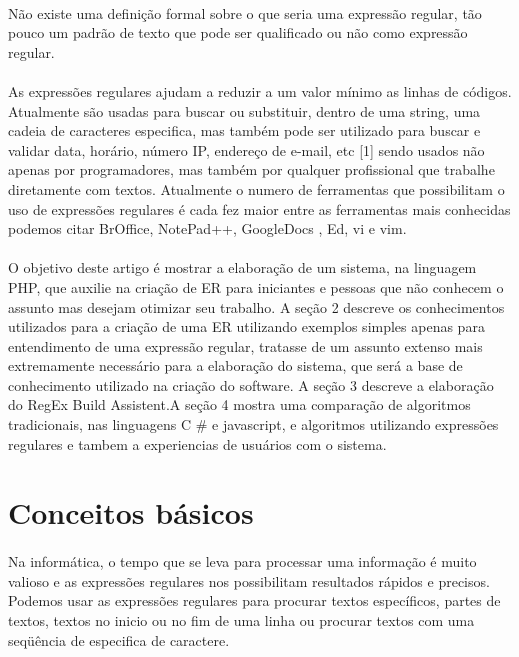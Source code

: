 \documentclass[10pt,a4paper]{article}
\begin{document}
\paragraph*{} Não existe uma definição formal sobre o que seria uma expressão regular, tão pouco um padrão de texto que pode ser qualificado ou não como expressão regular.
\paragraph*{}
 As expressões regulares ajudam a reduzir a um valor mínimo as linhas de códigos. Atualmente são usadas para buscar ou substituir, dentro de uma string, uma cadeia de caracteres especifica, mas também pode ser utilizado para buscar e validar data, horário, número IP, endereço de e-mail, etc [1] sendo usados não apenas por programadores, mas também por qualquer profissional que trabalhe diretamente com textos. Atualmente o numero de ferramentas que possibilitam o uso de expressões regulares é cada fez maior entre as ferramentas mais conhecidas podemos citar BrOffice, NotePad++, GoogleDocs , Ed, vi e vim.
\paragraph*{}
O objetivo deste artigo é mostrar a elaboração de um sistema, na linguagem PHP, que auxilie na criação de ER para iniciantes e pessoas que não conhecem o assunto mas desejam otimizar seu trabalho. A seção 2 descreve os conhecimentos utilizados para a criação de uma ER utilizando exemplos simples apenas para entendimento de uma expressão regular, tratasse de um assunto extenso mais extremamente necessário para a elaboração do sistema, que será a base de conhecimento utilizado na criação do software. A seção 3 descreve a elaboração do RegEx Build Assistent.A seção 4 mostra uma comparação de algoritmos tradicionais, nas linguagens C \# e javascript, e algoritmos utilizando expressões regulares e tambem a experiencias de usuários com o sistema.
\section{Conceitos básicos}
\paragraph*{}
Na informática, o tempo que se leva para processar uma informação é muito valioso e as expressões regulares nos possibilitam resultados rápidos e precisos. Podemos usar as expressões regulares para procurar textos específicos, partes de textos, textos no inicio ou no fim de uma linha ou procurar textos com uma seqüência de especifica de caractere.
\end{document}
